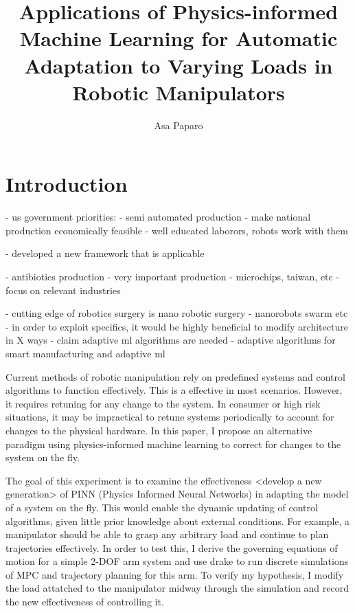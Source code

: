 \documentclass{article}
\title{Applications of Physics-informed Machine Learning for Automatic Adaptation to Varying Loads in Robotic Manipulators}
\author{Asa Paparo}
\begin{document}
\maketitle

\section*{Introduction}

    - us government priorities:
    - semi automated production
    - make national production economically feasible
    - well educated laborors, robots work with them

    - developed a new framework that is applicable
    
    - antibiotics production
    - very important production
    - microchips, taiwan, etc
    - focus on relevant industries

    - cutting edge of robotics surgery is nano robotic surgery
    - nanorobots swarm etc
    - in order to exploit specifics, it would be highly beneficial to modify architecture in X ways
    - claim adaptive ml algorithms are needed
    - adaptive algorithms for smart manufacturing and adaptive ml

    Current methods of robotic manipulation rely on predefined systems and control algorithms to function effectively. \cite{underactuated} This is a effective in most scenarios. However, it requires retuning for any change to the system. In consumer or high risk situations, it may be impractical to retune systems periodically to account for changes to the physical hardware. In this paper, I propose an alternative paradigm using physics-informed machine learning to correct for changes to the system on the fly.

    The goal of this experiment is to examine the effectiveness <develop a new generation> of PINN (Physics Informed Neural Networks) in adapting the model of a system on the fly. This would enable the dynamic updating of control algorithms, given little prior knowledge about external conditions. For example, a manipulator should be able to grasp any arbitrary load and continue to plan trajectories effectively. In order to test this, I derive the governing equations of motion for a simple 2-DOF arm system and use drake \cite{drake} to run discrete simulations of MPC and trajectory planning for this arm. To verify my hypothesis, I modify the load attatched to the manipulator midway through the simulation and record the new effectiveness of controlling it.
\end{document}
